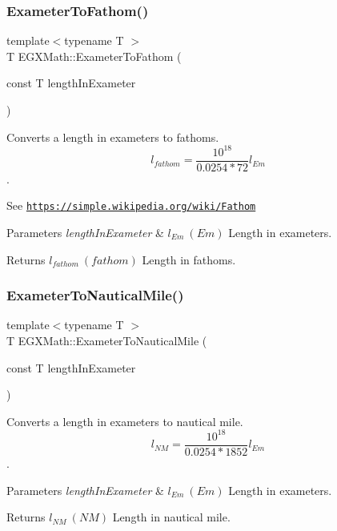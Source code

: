 \subsubsection{\texorpdfstring{Exameter\+To\+Fathom()}{ExameterToFathom()}}
{\footnotesize\ttfamily template$<$typename T $>$ \\
T E\+G\+X\+Math\+::\+Exameter\+To\+Fathom (\begin{DoxyParamCaption}\item[{const T}]{length\+In\+Exameter }\end{DoxyParamCaption})}



Converts a length in exameters to fathoms. \[ l_{fathom}= \frac{10^{18}}{0.0254 * 72} l_{Em} \]. 

See \href{https://simple.wikipedia.org/wiki/Fathom}{\tt https\+://simple.\+wikipedia.\+org/wiki/\+Fathom} 
\begin{DoxyParams}{Parameters}
{\em length\+In\+Exameter} & $ l_{Em}\ (Em)$ Length in exameters. \\
\hline
\end{DoxyParams}
\begin{DoxyReturn}{Returns}
$ l_{fathom}\ (fathom)$ Length in fathoms. 
\end{DoxyReturn}
\mbox{\label{group___e_g_x_math-_conversions-_length_conversions-_s_i-_exameter-_nautical_gaf593ae9d78bd889caca4e9249be1464a}} 
\subsubsection{\texorpdfstring{Exameter\+To\+Nautical\+Mile()}{ExameterToNauticalMile()}}
{\footnotesize\ttfamily template$<$typename T $>$ \\
T E\+G\+X\+Math\+::\+Exameter\+To\+Nautical\+Mile (\begin{DoxyParamCaption}\item[{const T}]{length\+In\+Exameter }\end{DoxyParamCaption})}



Converts a length in exameters to nautical mile. \[ l_{NM}= \frac{10^{18}}{0.0254 * 1852} l_{Em} \]. 


\begin{DoxyParams}{Parameters}
{\em length\+In\+Exameter} & $ l_{Em}\ (Em)$ Length in exameters. \\
\hline
\end{DoxyParams}
\begin{DoxyReturn}{Returns}
$ l_{NM}\ (NM)$ Length in nautical mile. 
\end{DoxyReturn}
